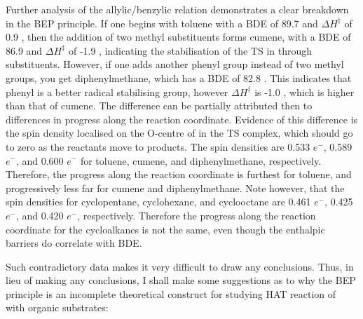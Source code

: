 Further analysis of the allylic/benzylic relation demonstrates a clear breakdown in the BEP principle. If one begins with toluene with a BDE of 89.7 \kcalmol and $\Delta H^\ddagger$ of 0.9 \kcalmol, then the addition of two methyl substituents forms cumene, with a BDE of 86.9 \kcalmol and $\Delta H^\ddagger$ of -1.9 \kcalmol, indicating the stabilisation of the TS in through substituents. However, if one adds another phenyl group instead of two methyl groups, you get diphenylmethane, which has a BDE of 82.8 \kcalmol. This indicates that phenyl is a better radical stabilising group, however $\Delta H^\ddagger$ is -1.0 \kcalmol, which is higher than that of cumene. The difference can be partially attributed then to differences in progress along the reaction coordinate. Evidence of this difference is the spin density localised on the O-centre of \cumo in the TS complex, which should go to zero as the reactants move to products. The  spin densities are 0.533 $e^-$, 0.589 $e^-$, and 0.600 $e^-$ for toluene, cumene, and diphenylmethane, respectively. Therefore, the progress along the reaction coordinate is furthest for toluene, and progressively less far for cumene and diphenylmethane. Note however, that the  spin densities for cyclopentane, cyclohexane, and cyclooctane are 0.461 $e^-$, 0.425 $e^-$, and 0.420 $e^-$, respectively. Therefore the progress along the reaction coordinate for the cycloalkanes is not the same, even though the enthalpic barriers do correlate with BDE.

Such contradictory data makes it very difficult to draw any conclusions. Thus, in lieu of making any conclusions, I shall make some suggestions as to why the BEP principle is an incomplete theoretical construct for studying HAT reaction of \cumo~ with organic substrates:


